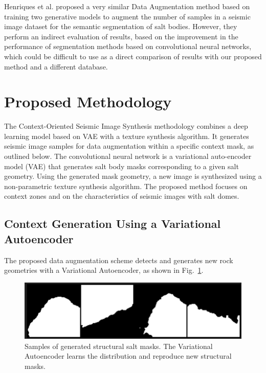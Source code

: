\documentclass{ieeeaccess}
\begin{document}
Henriques et al. \cite{ref1} proposed a very similar Data Augmentation method based on training two generative models to augment the number of samples in a seismic image dataset for the semantic segmentation of salt bodies. However, they perform an indirect evaluation of results, based on the improvement in the performance of segmentation methods based on convolutional neural networks, which could be difficult to use as a direct comparison of results with our proposed method and a different database.

\section{Proposed Methodology}

The Context-Oriented Seismic Image Synthesis methodology combines a deep learning model based on VAE with a texture synthesis algorithm. It generates seismic image samples for data augmentation within a specific context mask, as outlined below. The convolutional neural network is a variational auto-encoder model (VAE) that generates salt body masks corresponding to a given salt geometry. Using the generated mask geometry, a new image is synthesized using a non-parametric texture synthesis algorithm. The proposed method focuses on context zones and on the characteristics of seismic images with salt domes. %


\subsection{Context Generation Using a Variational Autoencoder}

The proposed data augmentation scheme detects and generates new rock geometries with a Variational Autoencoder, as shown in Fig.~\ref{fig:vae1}.  
\begin{figure}
    \centering
    \includegraphics[width=1\linewidth]{images/vaesGen.png}
    \caption{Samples of generated structural salt masks. The Variational Autoencoder learns the distribution and reproduce new structural masks.}
    \label{fig:vae1}
\end{figure}
\end{document}

